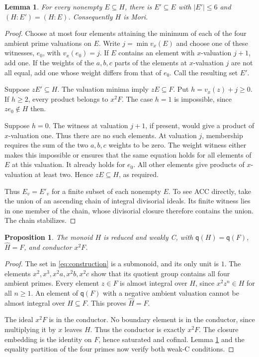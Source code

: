 \documentclass[11pt]{article}
\newtheorem{lemma}[theorem]{Lemma}
\newtheorem{proposition}[theorem]{Proposition}
\theoremstyle{definition}
\newcommand{\q}{\mathsf q}
\begin{document}
\begin{lemma}\label{lem:mori}
For every nonempty $E\subseteq H$, there is $E'\subseteq E$ with $|E'|\leq6$ and $(H:E')=(H:E)$. Consequently $H$ is Mori.
\end{lemma}
\begin{proof}
Choose at most four elements attaining the minimum of each of the four ambient prime valuations on $E$. Write $j=\min v_x(E)$ and choose one of these witnesses, $e_0$, with $v_x(e_0)=j$. If $E$ contains an element with $x$-valuation $j+1$, add one. If the weights of the $a,b,c$ parts of the elements at $x$-valuation $j$ are not all equal, add one whose weight differs from that of $e_0$. Call the resulting set $E'$.

Suppose $zE'\subseteq H$. The valuation minima imply $zE\subseteq F$. Put $h=v_x(z)+j\geq0$. If $h\geq2$, every product belongs to $x^2F$. The case $h=1$ is impossible, since $ze_0\notin H$ then.

Suppose $h=0$. The witness at valuation $j+1$, if present, would give a product of $x$-valuation one. Thus there are no such elements. At valuation $j$, membership requires the sum of the two $a,b,c$ weights to be zero. The weight witness either makes this impossible or ensures that the same equation holds for all elements of $E$ at this valuation. It already holds for $e_0$. All other elements give products of $x$-valuation at least two. Hence $zE\subseteq H$, as required.

Thus $E_v=E'_v$ for a finite subset of each nonempty $E$. To see ACC directly, take the union of an ascending chain of integral divisorial ideals. Its finite witness lies in one member of the chain, whose divisorial closure therefore contains the union. The chain stabilizes.
\end{proof}

\newpage
\begin{proposition}\label{prop:weak-c}
The monoid $H$ is reduced and weakly C, with $\q(H)=\q(F)$, $\widehat H=F$, and conductor $x^2F$.
\end{proposition}
\begin{proof}
The set in \eqref{eq:construction} is a submonoid, and its only unit is $1$. The elements $x^2,x^3,x^2a,x^2b,x^2c$ show that its quotient group contains all four ambient primes. Every element $z\in F$ is almost integral over $H$, since $x^2z^n\in H$ for all $n\geq1$. An element of $\q(F)$ with a negative ambient valuation cannot be almost integral over $H\subseteq F$. This proves $\widehat H=F$.

The ideal $x^2F$ is in the conductor. No boundary element is in the conductor, since multiplying it by $x$ leaves $H$. Thus the conductor is exactly $x^2F$. The closure embedding is the identity on $F$, hence saturated and cofinal. Lemma \ref{lem:mori} and the equality partition of the four primes now verify both weak-C conditions.
\end{proof}
\end{document}
